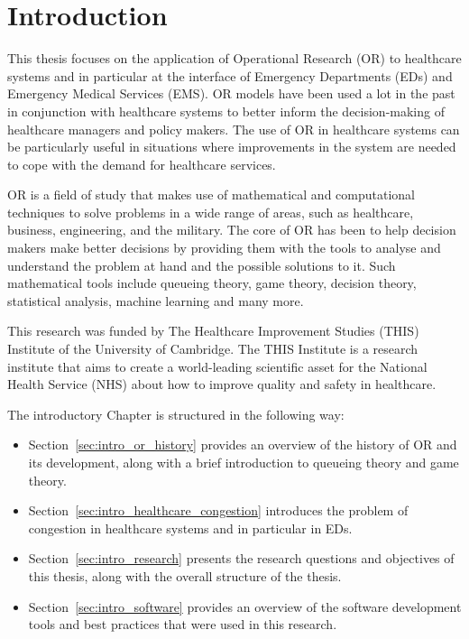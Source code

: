 \chapter{Introduction}\label{sec:introduction}

This thesis focuses on the application of Operational Research (OR) to
healthcare systems and in
particular at the interface of Emergency Departments (EDs) and Emergency
Medical Services (EMS).
OR models have been used a lot in the past in conjunction with healthcare
systems to better inform the decision-making of healthcare managers and
policy makers.
The use of OR in healthcare systems can be particularly useful in situations
where improvements in the system are needed to cope with the demand for
healthcare services.

OR is a field of study that makes use of mathematical
and computational techniques to solve problems in a wide range of areas, such
as healthcare, business, engineering, and the military.
The core of OR has been to help decision makers make better decisions by
providing them with the tools to analyse and understand the problem at hand and
the possible solutions to it.
Such mathematical tools include queueing theory, game theory, decision theory,
statistical analysis, machine learning and many more.

This research was funded by The Healthcare Improvement Studies (THIS) Institute
of the University of Cambridge.
The THIS Institute is a research institute that aims to create a world-leading
scientific asset for the National Health Service (NHS) about how to improve
quality and safety in healthcare.

The introductory Chapter is structured in the following way:
\begin{itemize}
    \item Section~\ref{sec:intro_or_history} provides an overview of the
    history of OR and its development, along with a brief introduction to
    queueing theory and game theory.
    \item Section~\ref{sec:intro_healthcare_congestion} introduces the problem
    of congestion in healthcare systems and in particular in EDs.
    \item Section~\ref{sec:intro_research} presents the research questions and
    objectives of this thesis, along with the overall structure of the thesis.
    \item Section~\ref{sec:intro_software} provides an overview of the software
    development tools and best practices that were used in this research.
\end{itemize}


